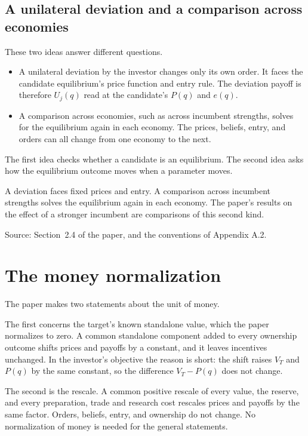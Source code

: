 \subsection*{A unilateral deviation and a comparison across economies}

These two ideas answer different questions.

\begin{itemize}
\item A unilateral deviation by the investor changes only its own order. It faces the candidate equilibrium's price function and entry rule. The deviation payoff is therefore \(U_j(q)\) read at the candidate's \(P(q)\) and \(e(q)\).
\item A comparison across economies, such as across incumbent strengths, solves for the equilibrium again in each economy. The prices, beliefs, entry, and orders can all change from one economy to the next.
\end{itemize}

The first idea checks whether a candidate is an equilibrium.
The second idea asks how the equilibrium outcome moves when a parameter moves.

\begin{watchout}
A deviation faces fixed prices and entry.
A comparison across incumbent strengths solves the equilibrium again in each economy.
The paper's results on the effect of a stronger incumbent are comparisons of this second kind.
\end{watchout}

{\small\color{notegrey}Source: Section~2.4 of the paper, and the conventions of Appendix A.2.}

\section{The money normalization}\label{sec:model-money}

The paper makes two statements about the unit of money.

The first concerns the target's known standalone value, which the paper normalizes to zero.
A common standalone component added to every ownership outcome shifts prices and payoffs by a constant, and it leaves incentives unchanged.
In the investor's objective the reason is short: the shift raises \(V_T\) and \(P(q)\) by the same constant, so the difference \(V_T-P(q)\) does not change.

The second is the rescale.
A common positive rescale of every value, the reserve, and every preparation, trade and research cost rescales prices and payoffs by the same factor.
Orders, beliefs, entry, and ownership do not change.
No normalization of money is needed for the general statements.

